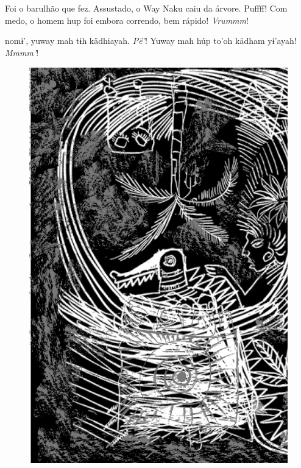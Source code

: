 \chapter*{}

\mbox{}\vspace*{\fill}

 Foi o barulhão
que fez. Assustado,
o Way Naku caiu da
árvore. Puffff!
Com medo, o homem
hup foi embora
correndo, bem
rápido! \textit{Vrummm}!

\vspace{2em}

 nomɨ’, yuway
mah tɨh kädhiayah.
\textit{Pë’}! Yuway mah
húp to’oh kädham
yɨ’ayah! \textit{Mmmm’}!

\vspace*{\fill}

\begin{figure}
\vspace*{-1.5cm}
\hspace*{-2.4cm}\includegraphics[width=142mm]{./imgs/img6.jpg}
\end{figure}

